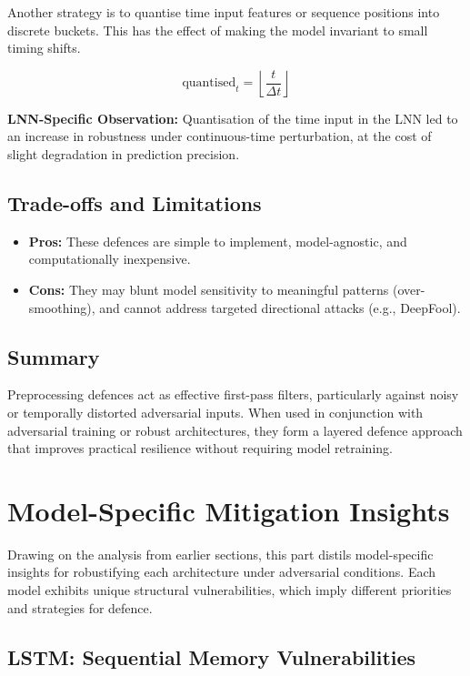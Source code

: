 Another strategy is to quantise time input features or sequence positions into discrete buckets. This has the effect of making the model invariant to small timing shifts.

\[
\text{quantised}_t = \left\lfloor \frac{t}{\Delta t} \right\rfloor
\]

\textbf{LNN-Specific Observation:} Quantisation of the time input in the LNN led to an increase in robustness under continuous-time perturbation, at the cost of slight degradation in prediction precision.

\subsection{Trade-offs and Limitations}

\begin{itemize}
    \item \textbf{Pros:} These defences are simple to implement, model-agnostic, and computationally inexpensive.
    \item \textbf{Cons:} They may blunt model sensitivity to meaningful patterns (over-smoothing), and cannot address targeted directional attacks (e.g., DeepFool).
\end{itemize}

\subsection{Summary}

Preprocessing defences act as effective first-pass filters, particularly against noisy or temporally distorted adversarial inputs. When used in conjunction with adversarial training or robust architectures, they form a layered defence approach that improves practical resilience without requiring model retraining.

\section{Model-Specific Mitigation Insights}

Drawing on the analysis from earlier sections, this part distils model-specific insights for robustifying each architecture under adversarial conditions. Each model exhibits unique structural vulnerabilities, which imply different priorities and strategies for defence.

\subsection{LSTM: Sequential Memory Vulnerabilities}

